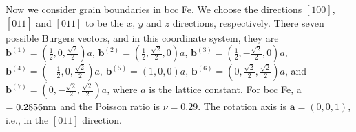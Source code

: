 \documentclass[smallextended]{svjour3}
\begin{document}
%
%
%
%
%




Now we consider grain boundaries in bcc Fe. We choose the directions  $[100]$, $[01\bar 1]$ and $[011]$ to be the $x$, $y$ and $z$ directions, respectively. There seven possible Burgers vectors, and in this coordinate system, they are $\mathbf{b}^{(1)}=\left(\frac{1}{2},0,\frac{\sqrt{2}}{2}\right)a$, $\mathbf{b}^{(2)}=\left(\frac{1}{2},\frac{\sqrt{2}}{2},0\right)a$,
$\mathbf{b}^{(3)}=\left(\frac{1}{2},-\frac{\sqrt{2}}{2},0\right)a$,
$\mathbf{b}^{(4)}=\left(-\frac{1}{2},0,\frac{\sqrt{2}}{2}\right)a$,
$\mathbf{b}^{(5)}=(1,0,0)a$, $\mathbf{b}^{(6)}=\left(0,\frac{\sqrt{2}}{2},\frac{\sqrt{2}}{2}\right)a$, and
$\mathbf{b}^{(7)}=\left(0,-\frac{\sqrt{2}}{2},\frac{\sqrt{2}}{2}\right)a$, where $a$ is the lattice constant.  For bcc Fe, a$=0.2856 \rm nm$  and the Poisson ratio is $\nu=0.29$.  The rotation axis is $\mathbf{a}=(0,0,1)$, i.e., in the $[011]$ direction.
\end{document}
